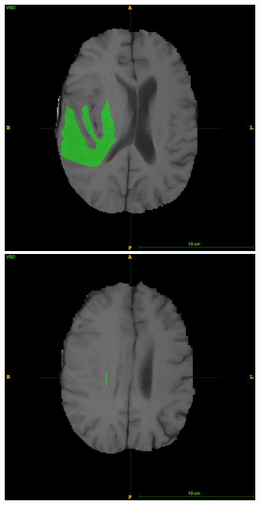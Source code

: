 \documentclass[12pt,a4paper,twoside,openright]{report}
\begin{document}
\begin{figure}
	\includegraphics[scale=0.1]{expert_segmentation_109}
	\includegraphics[scale=0.1]{expert_segmentation_119}

\end{figure}
\end{document}

